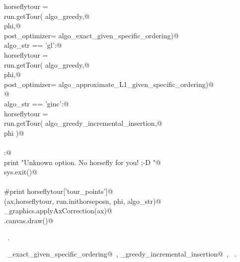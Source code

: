 \documentclass[11.5pt]{report}
\begin{document}
\begin{flushleft}
\begin{list}{}{}
\mbox{}\verb@      horseflytour = \@\\
\mbox{}\verb@             run.getTour( algo_greedy,@\\
\mbox{}\verb@                          phi,@\\
\mbox{}\verb@                          post_optimizer= algo_exact_given_specific_ordering)@\\
\mbox{}\verb@elif algo_str == 'gl':@\\
\mbox{}\verb@      horseflytour = \@\\
\mbox{}\verb@             run.getTour( algo_greedy,@\\
\mbox{}\verb@                          phi,@\\
\mbox{}\verb@                          post_optimizer= algo_approximate_L1_given_specific_ordering)@\\
\mbox{}\verb@                          @\\
\mbox{}\verb@elif algo_str == 'ginc':@\\
\mbox{}\verb@      horseflytour = \@\\
\mbox{}\verb@             run.getTour( algo_greedy_incremental_insertion,@\\
\mbox{}\verb@                          phi )@\\
\mbox{}\verb@@\\
\mbox{}\verb@else:@\\
\mbox{}\verb@      print "Unknown option. No horsefly for you! ;-D "@\\
\mbox{}\verb@      sys.exit()@\\
\mbox{}\verb@@\\
\mbox{}\verb@#print horseflytour['tour_points']@\\
\mbox{}\verb@plotTour(ax,horseflytour, run.inithorseposn, phi, algo_str)@\\
\mbox{}\verb@utils_graphics.applyAxCorrection(ax)@\\
\mbox{}\verb@fig.canvas.draw()@\\
\mbox{}\verb@@{\NWsep}
\end{list}
\vspace{-1.5ex}
\footnotesize
\begin{list}{}{\setlength{\itemsep}{-\parsep}\setlength{\itemindent}{-\leftmargin}}
\item \NWtxtMacroRefIn\ .
\item \NWtxtIdentsUsed\nobreak\  \verb@algo_exact_given_specific_ordering@\nobreak\ , \verb@algo_greedy_incremental_insertion@\nobreak\ , \verb@plotTour@\nobreak\ .
\item{}
\end{list}
\vspace{4ex}
\end{flushleft}
\end{document}
